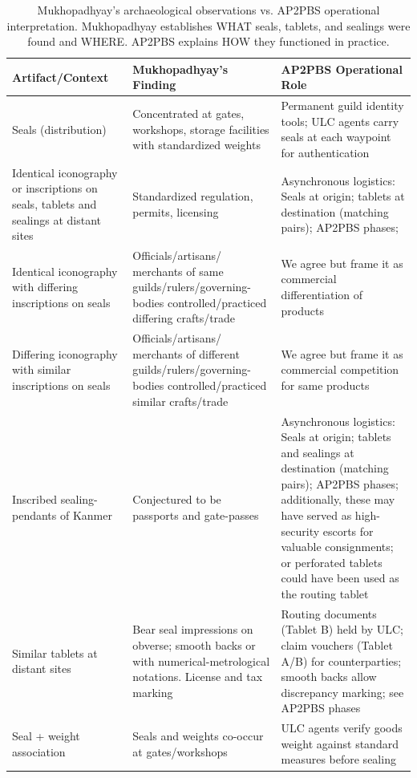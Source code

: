 \documentclass[12pt]{article}
\begin{document}
\begin{table}[htbp]
\centering
\caption{Mukhopadhyay's archaeological observations vs. AP2PBS operational interpretation.
Mukhopadhyay establishes WHAT seals, tablets, and sealings were found and WHERE. AP2PBS
explains HOW they functioned in practice.}
\label{tab:mukhopadhyay_abs_comparison}
\scriptsize
\setlength{\tabcolsep}{2.5pt}
\renewcommand{\arraystretch}{0.8}
\begin{tabular}{@{}p{3.4cm}p{4.8cm}p{6.8cm}@{}}
\toprule
\textbf{Artifact/Context} & \textbf{Mukhopadhyay's Finding} & \textbf{AP2PBS Operational Role} \\
\midrule
Seals (distribution) & Concentrated at gates, workshops, storage facilities
with standardized weights & Permanent guild identity tools; ULC agents carry seals
at each waypoint for authentication \\
\midrule
Identical iconography or inscriptions on seals, tablets and sealings at distant
sites & Standardized regulation, permits, licensing & Asynchronous logistics: Seals
at origin; tablets at destination (matching pairs); AP2PBS phases; \\
\midrule
Identical iconography with differing inscriptions on seals & Officials/artisans/
merchants of same guilds/rulers/governing-bodies controlled/practiced differing
crafts/trade & We agree but frame it as commercial differentiation of products \\
\midrule
Differing iconography with similar inscriptions on seals & Officials/artisans/
merchants of different guilds/rulers/governing-bodies controlled/practiced
similar crafts/trade & We agree but frame it as commercial competition for
same products \\
\midrule
Inscribed sealing-pendants of Kanmer & Conjectured to be passports and
gate-passes & Asynchronous logistics: Seals at origin; tablets and sealings at
destination (matching pairs); AP2PBS phases; additionally, these may have served
as high-security escorts for valuable consignments; or perforated tablets
could have been used as the routing tablet \\
\midrule
Similar tablets at distant sites & Bear seal impressions on obverse; smooth
backs or with numerical-metrological notations. License and tax marking &
Routing documents (Tablet B) held by ULC; claim vouchers (Tablet A/B) for
counterparties; smooth backs allow discrepancy marking; see AP2PBS phases \\
\midrule
Seal + weight association & Seals and weights co-occur at gates/workshops
& ULC agents verify goods weight against standard measures before sealing

\end{tabular}
\end{table}
\end{document}
